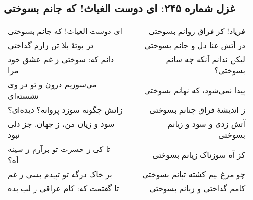 \begin{center}
\section*{غزل شماره ۲۴۵: ای دوست الغیاث! که جانم بسوختی}
\label{sec:245}
\begin{longtable}{l p{0.5cm} r}
ای دوست الغیاث! که جانم بسوختی
&&
فریاد! کز فراق روانم بسوختی
\\
در بوتهٔ بلا تن زارم گداختی
&&
در آتش عنا دل و جانم بسوختی
\\
دانم که: سوختی ز غم عشق خود مرا
&&
لیکن ندانم آنکه چه سانم بسوختی؟
\\
می‌سوزیم درون و تو در وی نشسته‌ای
&&
پیدا نمی‌شود، که نهانم بسوختی
\\
زاتش چگونه سوزد پروانه؟ دیده‌ای؟
&&
ز اندیشهٔ فراق چنانم بسوختی
\\
سود و زیان من، ز جهان، جز دلی نبود
&&
آتش زدی و سود و زیانم بسوختی
\\
تا کی ز حسرت تو برآرم ز سینه آه؟
&&
کز آه سوزناک زیانم بسوختی
\\
بر خاک درگه تو تپیدم بسی ز غم
&&
چو مرغ نیم کشته تپانم بسوختی
\\
تا گفتمت که: کام عراقی ز لب بده
&&
کامم گداختی و زبانم بسوختی
\\
\end{longtable}
\end{center}
